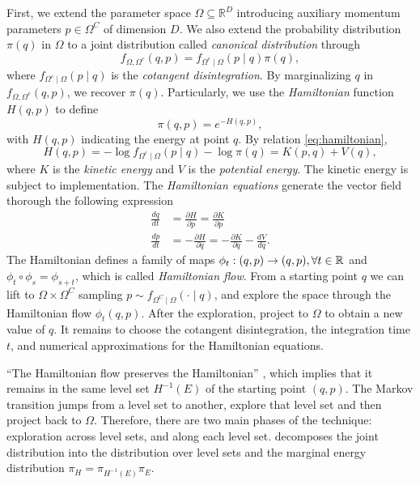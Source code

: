 First, we extend the parameter space $\Omega \subseteq \mathbb{R}^D$ 
introducing auxiliary momentum parameters $p \in \Omega^C$ of dimension $D$. We also
extend the probability distribution $\pi(q)$ in $\Omega$ to a joint
distribution called {\em canonical distribution} through 
$$f_{\Omega, \Omega^c}(q, p) = f_{\Omega^c \mid \Omega}(p
\mid q) \pi(q),$$
where $f_{\Omega^c \mid \Omega}(p
\mid q)$ is the {\em cotangent disintegration}. By marginalizing $q$ 
in $f_{\Omega, \Omega^c}(q, p)$, we recover $\pi(q)$. 
Particularly, we use the {\em Hamiltonian} function $H(q,p)$ to define
\begin{equation}
  \label{eq:hamiltonian}
  \pi(q,p) = e^{-H(q,p)}, 
\end{equation}
with $H(q,p)$ indicating the energy at point $q$. By relation
\eqref{eq:hamiltonian}, 
$$
H(q, p) = -\log f_{\Omega^c \mid \Omega}(p \mid q) - \log \pi(q) = K(p,q) + V(q), 
$$
where $K$ is the {\em kinetic energy} and $V$ is the {\em potential energy}.
The kinetic energy is subject to implementation. The {\em Hamiltonian
equations}
generate the vector field thorough the following expression
\begin{align*}
  \frac{dq}{dt} &= \frac{\partial H}{\partial p} = \frac{\partial K}{\partial p} \\
  \frac{dp}{dt} &= -\frac{\partial H}{\partial q} = -\frac{\partial K}{\partial q} - \frac{d V}{d q}.
\end{align*}
The Hamiltonian defines a family of maps $\phi_t : (q,p) \to (q,p), \forall t
\in \mathbb{R}$ and $\phi_t \circ \phi_s = \phi_{s+t}$, which is called {\em
Hamiltonian flow}. From a starting point $q$ we can lift to $\Omega \times
\Omega^C$ sampling $p \sim f_{\Omega^C \mid \Omega}(\cdot \mid q)$, and
explore the space through the Hamiltonian flow $\phi_t(q,p)$. After the
exploration, project to $\Omega$ to obtain a new value of $q$. It remains to
choose the cotangent disintegration, the integration time $t$, and numerical
approximations for the Hamiltonian equations.

``The Hamiltonian flow preserves the Hamiltonian'' \cite{metacademy2021}, which
implies that it remains in the same level set $H^{-1}(E)$ of the starting
point $(q,p)$. The Markov transition jumps from a level set to another,
explore that level set and then project back to $\Omega$. Therefore, 
there are two main phases of the technique: exploration across level sets, and
along each level set. \textcite[p. 6]{betancourt2016diagnosing} decomposes the
joint distribution into the distribution over level sets and the marginal
energy distribution $\pi_H = \pi_{H^{-1}(E)}\pi_{E}$.

